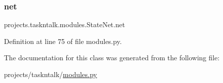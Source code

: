 \subsubsection{\texorpdfstring{net}{net}}
{\footnotesize\ttfamily projects.\+taskntalk.\+modules.\+State\+Net.\+net}



Definition at line 75 of file modules.\+py.



The documentation for this class was generated from the following file\+:\begin{DoxyCompactItemize}
\item 
projects/taskntalk/\hyperlink{projects_2taskntalk_2modules_8py}{modules.\+py}\end{DoxyCompactItemize}
